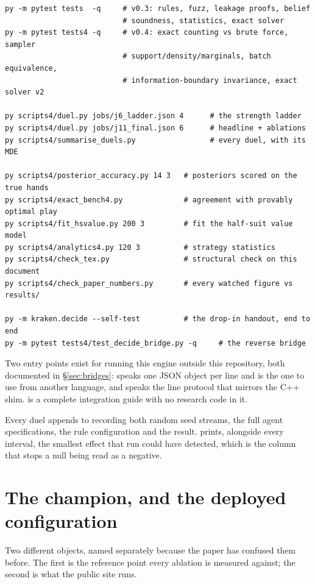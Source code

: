 \documentclass[11pt,letterpaper]{article}
\begin{document}
\begin{verbatim}
py -m pytest tests  -q     # v0.3: rules, fuzz, leakage proofs, belief
                           # soundness, statistics, exact solver
py -m pytest tests4 -q     # v0.4: exact counting vs brute force, sampler
                           # support/density/marginals, batch equivalence,
                           # information-boundary invariance, exact solver v2

py scripts4/duel.py jobs/j6_ladder.json 4      # the strength ladder
py scripts4/duel.py jobs/j11_final.json 6      # headline + ablations
py scripts4/summarise_duels.py                 # every duel, with its MDE

py scripts4/posterior_accuracy.py 14 3   # posteriors scored on the true hands
py scripts4/exact_bench4.py              # agreement with provably optimal play
py scripts4/fit_hsvalue.py 200 3         # fit the half-suit value model
py scripts4/analytics4.py 120 3          # strategy statistics
py scripts4/check_tex.py                 # structural check on this document
py scripts4/check_paper_numbers.py       # every watched figure vs results/

py -m kraken.decide --self-test          # the drop-in handout, end to end
py -m pytest tests4/test_decide_bridge.py -q     # the reverse bridge
\end{verbatim}

Two entry points exist for running this engine outside this repository, both
documented in \S\ref{sec:bridges}:  speaks one JSON
object per line and is the one to use from another language, and
 speaks the line protocol that mirrors the C++ shim.
 is a complete integration guide with no research code
in it.

Every duel appends to  recording both random
seed streams, the full agent specifications, the rule configuration and the
result.  prints, alongside every interval, the
smallest effect that run could have detected, which is the column that stops
a null being read as a negative.

\section{The champion, and the deployed configuration}
\label{app:champion}

Two different objects, named separately because the paper has confused them
before. The first is the reference point every ablation is measured against;
the second is what the public site runs.
\end{document}
